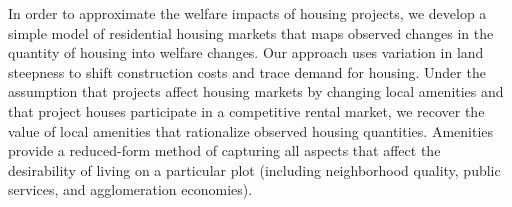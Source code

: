 \documentclass[12pt]{article}
\begin{document}




In order to approximate the welfare impacts of housing projects, we develop a simple model of residential housing markets that maps observed changes in the quantity of housing into welfare changes.  Our approach uses variation in land steepness to shift construction costs and trace demand for housing.  Under the assumption that projects affect housing markets by changing local amenities and that project houses participate in a competitive rental market, we recover the value of local amenities that rationalize observed housing quantities.  Amenities provide a reduced-form method of capturing all aspects that affect the desirability of living on a particular plot (including neighborhood quality, public services, and agglomeration economies).




\end{document}

